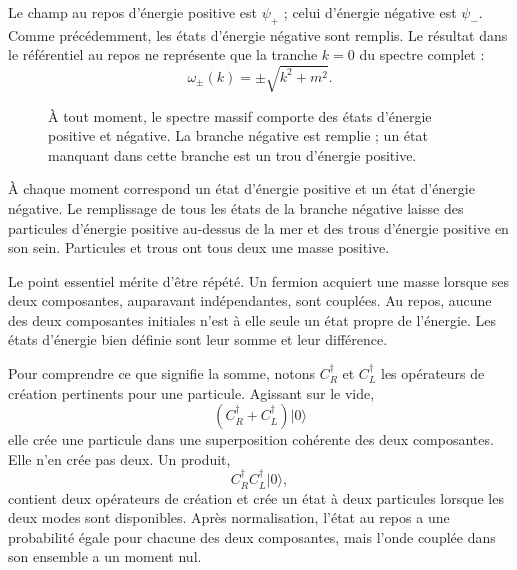 Le champ au repos d’énergie positive est \(\psi_+\) ; celui d’énergie négative est \(\psi_-\). Comme précédemment, les états d’énergie négative sont remplis. Le résultat dans le référentiel au repos ne représente que la tranche \(k=0\) du spectre complet :
\begin{equation}
\omega_\pm(k)=\pm\sqrt{k^2+m^2}.
\end{equation}
\begin{figure}[htbp]
\centering
{}
\caption{À tout moment, le spectre massif comporte des états d’énergie positive et négative. La branche négative est remplie ; un état manquant dans cette branche est un trou d’énergie positive.}
\end{figure}
À chaque moment correspond un état d’énergie positive et un état d’énergie négative. Le remplissage de tous les états de la branche négative laisse des particules d’énergie positive au-dessus de la mer et des trous d’énergie positive en son sein. Particules et trous ont tous deux une masse positive.

Le point essentiel mérite d’être répété. Un fermion acquiert une masse lorsque ses deux composantes, auparavant indépendantes, sont couplées. Au repos, aucune des deux composantes initiales n’est à elle seule un état propre de l’énergie. Les états d’énergie bien définie sont leur somme et leur différence.

Pour comprendre ce que signifie la somme, notons \(C_R^\dagger\) et \(C_L^\dagger\) les opérateurs de création pertinents pour une particule. Agissant sur le vide,
\begin{equation}
(C_R^\dagger+C_L^\dagger)\lvert0\rangle
\end{equation}
elle crée une particule dans une superposition cohérente des deux composantes. Elle n’en crée pas deux. Un produit,
\begin{equation}
C_R^\dagger C_L^\dagger\lvert0\rangle,
\end{equation}
contient deux opérateurs de création et crée un état à deux particules lorsque les deux modes sont disponibles. Après normalisation, l’état au repos a une probabilité égale pour chacune des deux composantes, mais l’onde couplée dans son ensemble a un moment nul.

